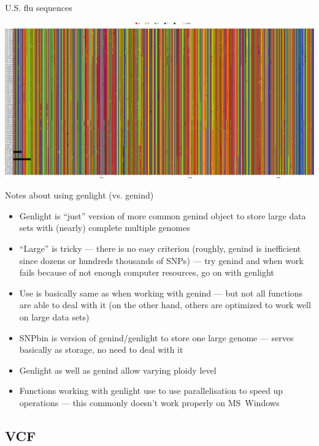 \documentclass[compress, ucs, xelatex, 11pt, xcolor=svgnames, aspectratio=169,
	hyperref={
		bookmarks=true,
		unicode=true,
		colorlinks=true,
		pdftitle={Molecular data in R},
		plainpages=false,
		pdfauthor={Vojtech Zeisek},
		pdfsubject={Course about phylogeny and evolution in R},
		pdfcreator={XeLaTeX},
		pdfkeywords={R, evolution, phylogeny, molecular data},
		linkcolor=Crimson, %
		anchorcolor=Magenta, %
		citecolor=Magenta, %
		filecolor=Magenta, %
		menucolor=Magenta, %
		urlcolor=DodgerBlue, %
		pdftex},
	url={hyphens, lowtilde} %
	]{beamer}
\begin{document}
\begin{frame}{U.S. flu sequences}
	\begin{center}
		\includegraphics[width=\textwidth-2.5cm]{sequences_usflu.png}
	\end{center}
\end{frame}

\begin{frame}{Notes about using genlight (vs. genind)}
	\begin{itemize}
		\item Genlight is \enquote{just} version of more common genind object to store large data sets with (nearly) complete multiple genomes
		\item \enquote{Large} is tricky --- there is no easy criterion (roughly, genind is inefficient since dozens or hundreds thousands of SNPs) --- try genind and when work fails because of not enough computer resources, go on with genlight
		\item Use is basically same as when working with genind --- but not all functions are able to deal with it (on the other hand, others are optimized to work well on large data sets)
		\item SNPbin is version of genind/genlight to store one large genome --- serves basically as storage, no need to deal with it
		\item Genlight as well as genind allow varying ploidy level
		\item Functions working with genlight use to use parallelisation to speed up operations --- this commonly doesn't work properly on MS~Windows
	\end{itemize}
\end{frame}

\subsection{VCF}
\end{document}
